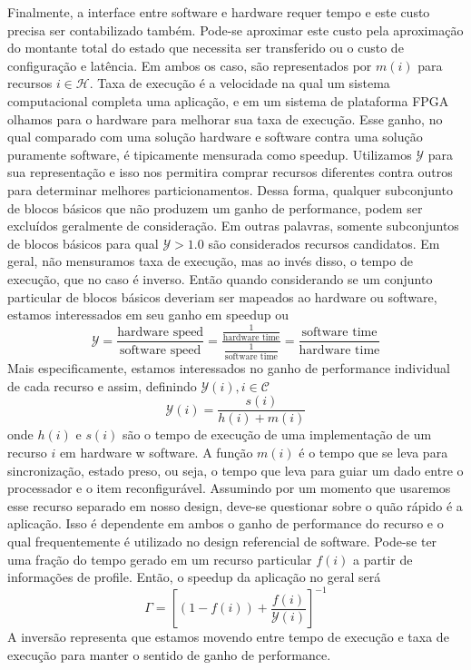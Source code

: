 Finalmente, a interface entre software e hardware requer tempo e este custo precisa ser contabilizado também. Pode-se aproximar este custo pela aproximação do montante total do estado que necessita ser transferido ou o custo de configuração e latência. Em ambos os caso, são representados por $ m(i) $ para recursos $ i \in \mathcal{H} $.
Taxa de execução é a velocidade na qual um sistema computacional completa uma aplicação, e em um sistema de plataforma FPGA olhamos para o hardware para melhorar sua taxa de execução. Esse ganho, no qual comparado com uma solução hardware e software contra uma solução puramente software, é tipicamente mensurada como speedup. Utilizamos $ \mathcal{Y} $ para sua representação e isso nos permitira comprar recursos diferentes contra outros para determinar melhores particionamentos. Dessa forma, qualquer subconjunto de blocos básicos que não produzem um ganho de performance, podem ser excluídos geralmente de consideração. Em outras palavras, somente subconjuntos de blocos básicos para qual $ \mathcal{Y} > 1.0 $ são considerados recursos candidatos.
Em geral, não mensuramos taxa de execução, mas ao invés disso, o tempo de execução, que no caso é inverso. Então quando considerando se um conjunto particular de blocos básicos deveriam ser mapeados ao hardware ou software, estamos interessados em seu ganho em speedup ou 
$$ \mathcal{Y} = \frac{\text{hardware speed}}{\text{software speed}} = \frac{\frac{1}{\text{hardware time}}}{\frac{1}{\text{software time}}} = \frac{\text{software time}}{\text{hardware time}} $$
Mais especificamente, estamos interessados no ganho de performance individual de cada recurso e assim, definindo $ \mathcal{Y}(i), i \in \mathcal{C} $
$$ \mathcal{Y}(i) = \frac{s(i)}{h(i) + m(i) } $$
onde $ h(i) $ e $ s(i) $ são o tempo de execução de uma implementação de um recurso $ i $ em hardware w software. A função $ m(i) $ é o tempo que se leva para sincronização, estado preso, ou seja, o tempo que leva para guiar um dado entre o processador e o item reconfigurável.
Assumindo por um momento que usaremos esse recurso separado em nosso design, deve-se questionar sobre o quão rápido é a aplicação. Isso é dependente em ambos o ganho de performance do recurso e o qual frequentemente é utilizado no design referencial de software. Pode-se ter uma fração do tempo gerado em um recurso particular $ f(i) $ a partir de informações de profile. Então, o speedup da aplicação no geral será
$$ \Gamma = \left [ (1 - f(i)) + \frac{f(i)}{\mathcal{Y}(i)} \right ]^{-1}  $$
A inversão representa que estamos movendo entre tempo de execução e taxa de execução para manter o sentido de ganho de performance.
